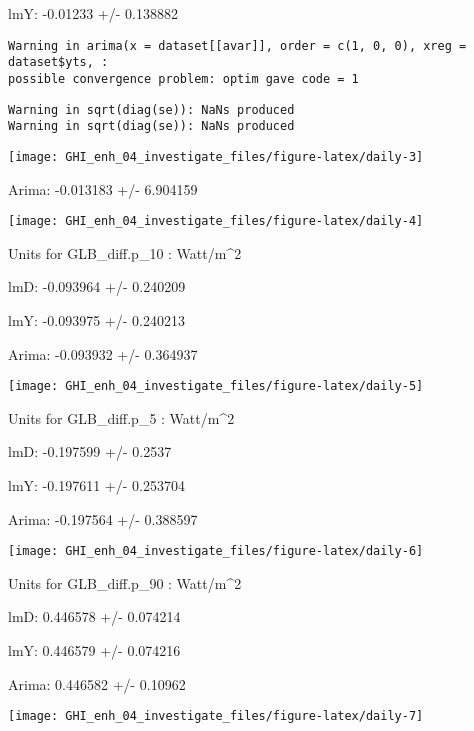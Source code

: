 \documentclass[
  10pt,
  a4paper,oneside]{article}
\begin{document}
lmY: -0.01233 +/- 0.138882

\begin{verbatim}
Warning in arima(x = dataset[[avar]], order = c(1, 0, 0), xreg = dataset$yts, :
possible convergence problem: optim gave code = 1
\end{verbatim}

\begin{verbatim}
Warning in sqrt(diag(se)): NaNs produced
Warning in sqrt(diag(se)): NaNs produced
\end{verbatim}

\begin{center}\texttt{[image: GHI\_enh\_04\_investigate\_files/figure-latex/daily-3]} \end{center}

Arima: -0.013183 +/- 6.904159

\begin{center}\texttt{[image: GHI\_enh\_04\_investigate\_files/figure-latex/daily-4]} \end{center}

Units for GLB\_diff.p\_10 : Watt/m\^{}2

lmD: -0.093964 +/- 0.240209

lmY: -0.093975 +/- 0.240213

Arima: -0.093932 +/- 0.364937

\begin{center}\texttt{[image: GHI\_enh\_04\_investigate\_files/figure-latex/daily-5]} \end{center}

Units for GLB\_diff.p\_5 : Watt/m\^{}2

lmD: -0.197599 +/- 0.2537

lmY: -0.197611 +/- 0.253704

Arima: -0.197564 +/- 0.388597

\begin{center}\texttt{[image: GHI\_enh\_04\_investigate\_files/figure-latex/daily-6]} \end{center}

Units for GLB\_diff.p\_90 : Watt/m\^{}2

lmD: 0.446578 +/- 0.074214

lmY: 0.446579 +/- 0.074216

Arima: 0.446582 +/- 0.10962

\begin{center}\texttt{[image: GHI\_enh\_04\_investigate\_files/figure-latex/daily-7]} \end{center}
\end{document}
